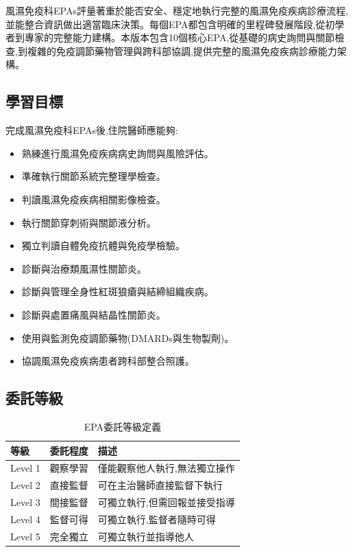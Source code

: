 \documentclass[12pt,a4paper]{article}
\newcommand{\note}[1]{
    \par
    \noindent
    \begin{tcolorbox}[
        colback=rheum_blue!5!white,
        colframe=rheum_blue,
        title=\textbf{重點提醒},
        fonttitle=\bfseries,
        boxrule=0.5pt,
        arc=3pt,
        left=6pt,
        right=6pt,
        top=6pt,
        bottom=6pt
    ]
    #1
    \end{tcolorbox}
}
\begin{document}
\vspace{0.5cm}
\note{
風濕免疫科EPAs評量著重於能否安全、穩定地執行完整的風濕免疫疾病診療流程,並能整合資訊做出適當臨床決策。每個EPA都包含明確的里程碑發展階段,從初學者到專家的完整能力建構。本版本包含10個核心EPA,從基礎的病史詢問與關節檢查,到複雜的免疫調節藥物管理與跨科部協調,提供完整的風濕免疫疾病診療能力架構。
}

\subsection{學習目標}
完成風濕免疫科EPAs後,住院醫師應能夠:
\begin{itemize}[nosep]
    \item 熟練進行風濕免疫疾病病史詢問與風險評估。
    \item 準確執行關節系統完整理學檢查。
    \item 判讀風濕免疫疾病相關影像檢查。
    \item 執行關節穿刺術與關節液分析。
    \item 獨立判讀自體免疫抗體與免疫學檢驗。
    \item 診斷與治療類風濕性關節炎。
    \item 診斷與管理全身性紅斑狼瘡與結締組織疾病。
    \item 診斷與處置痛風與結晶性關節炎。
    \item 使用與監測免疫調節藥物(DMARDs與生物製劑)。
    \item 協調風濕免疫疾病患者跨科部整合照護。
\end{itemize}

\subsection{委託等級}
\begin{table}[h]
    \centering
    \caption{EPA委託等級定義}
    \begin{tabular}{p{2cm} p{3cm} p{9cm}}
        \toprule
        \textbf{等級} & \textbf{委託程度} & \textbf{描述} \\
        \midrule
        Level 1 & 觀察學習 & 僅能觀察他人執行,無法獨立操作 \\
        Level 2 & 直接監督 & 可在主治醫師直接監督下執行 \\
        Level 3 & 間接監督 & 可獨立執行,但需回報並接受指導 \\
        Level 4 & 監督可得 & 可獨立執行,監督者隨時可得 \\
        Level 5 & 完全獨立 & 可獨立執行並指導他人 \\
        \bottomrule
    \end{tabular}
\end{table}
\end{document}
